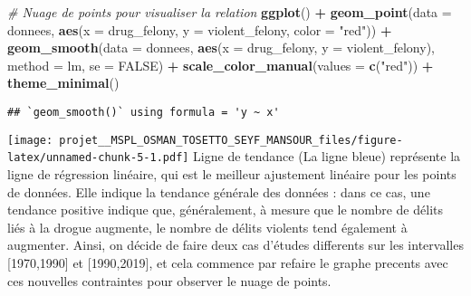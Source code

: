 \documentclass[
]{article}
\newenvironment{Shaded}{\begin{snugshade}}{\end{snugshade}}
\newcommand{\AttributeTok}[1]{\textcolor[rgb]{0.13,0.29,0.53}{#1}}
\newcommand{\CommentTok}[1]{\textcolor[rgb]{0.56,0.35,0.01}{\textit{#1}}}
\newcommand{\ConstantTok}[1]{\textcolor[rgb]{0.56,0.35,0.01}{#1}}
\newcommand{\FunctionTok}[1]{\textcolor[rgb]{0.13,0.29,0.53}{\textbf{#1}}}
\newcommand{\NormalTok}[1]{#1}
\newcommand{\SpecialCharTok}[1]{\textcolor[rgb]{0.81,0.36,0.00}{\textbf{#1}}}
\newcommand{\StringTok}[1]{\textcolor[rgb]{0.31,0.60,0.02}{#1}}
\begin{document}
\begin{Shaded}
\begin{Highlighting}[]
\CommentTok{\# Nuage de points pour visualiser la relation}
\FunctionTok{ggplot}\NormalTok{() }\SpecialCharTok{+} 
  \FunctionTok{geom\_point}\NormalTok{(}\AttributeTok{data =}\NormalTok{ donnees, }\FunctionTok{aes}\NormalTok{(}\AttributeTok{x =}\NormalTok{ drug\_felony, }\AttributeTok{y =}\NormalTok{ violent\_felony, }\AttributeTok{color =} \StringTok{"red"}\NormalTok{)) }\SpecialCharTok{+}
  \FunctionTok{geom\_smooth}\NormalTok{(}\AttributeTok{data =}\NormalTok{ donnees, }\FunctionTok{aes}\NormalTok{(}\AttributeTok{x =}\NormalTok{ drug\_felony, }\AttributeTok{y =}\NormalTok{ violent\_felony), }\AttributeTok{method =}\NormalTok{ lm, }\AttributeTok{se =} \ConstantTok{FALSE}\NormalTok{) }\SpecialCharTok{+}
  \FunctionTok{scale\_color\_manual}\NormalTok{(}\AttributeTok{values =} \FunctionTok{c}\NormalTok{(}\StringTok{"red"}\NormalTok{)) }\SpecialCharTok{+}
  \FunctionTok{theme\_minimal}\NormalTok{()}
\end{Highlighting}
\end{Shaded}

\begin{verbatim}
## `geom_smooth()` using formula = 'y ~ x'
\end{verbatim}

\texttt{[image: projet\_\_MSPL\_OSMAN\_TOSETTO\_SEYF\_MANSOUR\_files/figure-latex/unnamed-chunk-5-1.pdf]}
Ligne de tendance (La ligne bleue) représente la ligne de régression
linéaire, qui est le meilleur ajustement linéaire pour les points de
données. Elle indique la tendance générale des données : dans ce cas,
une tendance positive indique que, généralement, à mesure que le nombre
de délits liés à la drogue augmente, le nombre de délits violents tend
également à augmenter. Ainsi, on décide de faire deux cas d'études
differents sur les intervalles {[}1970,1990{]} et {[}1990,2019{]}, et
cela commence par refaire le graphe precents avec ces nouvelles
contraintes pour observer le nuage de points.
\end{document}
